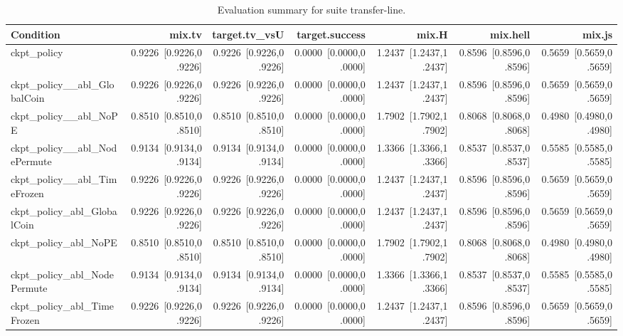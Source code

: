 \begin{table}[t]
\centering
\caption{Evaluation summary for suite transfer-line.}
\label{tab:eval_transfer-line}
\begin{tabular}{lrrrrrr}
\toprule
Condition & mix.tv & target.tv\_vsU & target.success & mix.H & mix.hell & mix.js \\
\midrule
ckpt\_policy & 0.9226~[0.9226,0.9226] & 0.9226~[0.9226,0.9226] & 0.0000~[0.0000,0.0000] & 1.2437~[1.2437,1.2437] & 0.8596~[0.8596,0.8596] & 0.5659~[0.5659,0.5659] \\
ckpt\_policy\_\_abl\_GlobalCoin & 0.9226~[0.9226,0.9226] & 0.9226~[0.9226,0.9226] & 0.0000~[0.0000,0.0000] & 1.2437~[1.2437,1.2437] & 0.8596~[0.8596,0.8596] & 0.5659~[0.5659,0.5659] \\
ckpt\_policy\_\_abl\_NoPE & 0.8510~[0.8510,0.8510] & 0.8510~[0.8510,0.8510] & 0.0000~[0.0000,0.0000] & 1.7902~[1.7902,1.7902] & 0.8068~[0.8068,0.8068] & 0.4980~[0.4980,0.4980] \\
ckpt\_policy\_\_abl\_NodePermute & 0.9134~[0.9134,0.9134] & 0.9134~[0.9134,0.9134] & 0.0000~[0.0000,0.0000] & 1.3366~[1.3366,1.3366] & 0.8537~[0.8537,0.8537] & 0.5585~[0.5585,0.5585] \\
ckpt\_policy\_\_abl\_TimeFrozen & 0.9226~[0.9226,0.9226] & 0.9226~[0.9226,0.9226] & 0.0000~[0.0000,0.0000] & 1.2437~[1.2437,1.2437] & 0.8596~[0.8596,0.8596] & 0.5659~[0.5659,0.5659] \\
ckpt\_policy\_abl\_GlobalCoin & 0.9226~[0.9226,0.9226] & 0.9226~[0.9226,0.9226] & 0.0000~[0.0000,0.0000] & 1.2437~[1.2437,1.2437] & 0.8596~[0.8596,0.8596] & 0.5659~[0.5659,0.5659] \\
ckpt\_policy\_abl\_NoPE & 0.8510~[0.8510,0.8510] & 0.8510~[0.8510,0.8510] & 0.0000~[0.0000,0.0000] & 1.7902~[1.7902,1.7902] & 0.8068~[0.8068,0.8068] & 0.4980~[0.4980,0.4980] \\
ckpt\_policy\_abl\_NodePermute & 0.9134~[0.9134,0.9134] & 0.9134~[0.9134,0.9134] & 0.0000~[0.0000,0.0000] & 1.3366~[1.3366,1.3366] & 0.8537~[0.8537,0.8537] & 0.5585~[0.5585,0.5585] \\
ckpt\_policy\_abl\_TimeFrozen & 0.9226~[0.9226,0.9226] & 0.9226~[0.9226,0.9226] & 0.0000~[0.0000,0.0000] & 1.2437~[1.2437,1.2437] & 0.8596~[0.8596,0.8596] & 0.5659~[0.5659,0.5659] \\
\bottomrule
\end{tabular}
\end{table}
